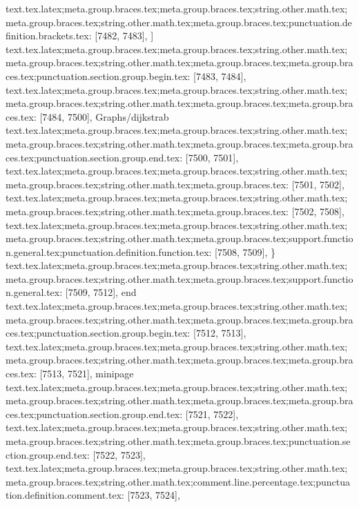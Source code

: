 {{{{{{{{{{{{{{{{{{{{{{{{{{{{{{{{{{{{{{{{{{{{{{{{{{{{{{{{{{{{{{{{{{{{{{{{{{{{{{{{{{{{{{{{{{{{{{{{{{{{{{{{{{{{{{{{{{{{{{{{{{{{{{{{{{{{{{{{{{{{{{{{{{{{{{{{{{{{{{{{{{{{{{{{{{{{{{{{{{{{{{{{{{{{{{{{{{{{{{{{{{{{text.tex.latex;meta.group.braces.tex;meta.group.braces.tex;string.other.math.tex;meta.group.braces.tex;string.other.math.tex;meta.group.braces.tex;punctuation.definition.brackets.tex: [7482, 7483], {]}
text.tex.latex;meta.group.braces.tex;meta.group.braces.tex;string.other.math.tex;meta.group.braces.tex;string.other.math.tex;meta.group.braces.tex;meta.group.braces.tex;punctuation.section.group.begin.tex: [7483, 7484], {{}
text.tex.latex;meta.group.braces.tex;meta.group.braces.tex;string.other.math.tex;meta.group.braces.tex;string.other.math.tex;meta.group.braces.tex;meta.group.braces.tex: [7484, 7500], {Graphs/dijkstrab}
text.tex.latex;meta.group.braces.tex;meta.group.braces.tex;string.other.math.tex;meta.group.braces.tex;string.other.math.tex;meta.group.braces.tex;meta.group.braces.tex;punctuation.section.group.end.tex: [7500, 7501], {}}
text.tex.latex;meta.group.braces.tex;meta.group.braces.tex;string.other.math.tex;meta.group.braces.tex;string.other.math.tex;meta.group.braces.tex: [7501, 7502], {
}
text.tex.latex;meta.group.braces.tex;meta.group.braces.tex;string.other.math.tex;meta.group.braces.tex;string.other.math.tex;meta.group.braces.tex: [7502, 7508], {      }
text.tex.latex;meta.group.braces.tex;meta.group.braces.tex;string.other.math.tex;meta.group.braces.tex;string.other.math.tex;meta.group.braces.tex;support.function.general.tex;punctuation.definition.function.tex: [7508, 7509], {\}
text.tex.latex;meta.group.braces.tex;meta.group.braces.tex;string.other.math.tex;meta.group.braces.tex;string.other.math.tex;meta.group.braces.tex;support.function.general.tex: [7509, 7512], {end}
text.tex.latex;meta.group.braces.tex;meta.group.braces.tex;string.other.math.tex;meta.group.braces.tex;string.other.math.tex;meta.group.braces.tex;meta.group.braces.tex;punctuation.section.group.begin.tex: [7512, 7513], {{}
text.tex.latex;meta.group.braces.tex;meta.group.braces.tex;string.other.math.tex;meta.group.braces.tex;string.other.math.tex;meta.group.braces.tex;meta.group.braces.tex: [7513, 7521], {minipage}
text.tex.latex;meta.group.braces.tex;meta.group.braces.tex;string.other.math.tex;meta.group.braces.tex;string.other.math.tex;meta.group.braces.tex;meta.group.braces.tex;punctuation.section.group.end.tex: [7521, 7522], {}}
text.tex.latex;meta.group.braces.tex;meta.group.braces.tex;string.other.math.tex;meta.group.braces.tex;string.other.math.tex;meta.group.braces.tex;punctuation.section.group.end.tex: [7522, 7523], {}}
text.tex.latex;meta.group.braces.tex;meta.group.braces.tex;string.other.math.tex;meta.group.braces.tex;string.other.math.tex;comment.line.percentage.tex;punctuation.definition.comment.tex: [7523, 7524], {%
}}}}}}}}}}}}}}}}}}}}}}}}}}}}}}}}}}}}}}}}}}}}}}}}}}}}}}}}}}}}}}}}}}}}}}}}}}}}}}}}}}}}}}}}}}}}}}}}}}}}}}}}}}}}}}}}}}}}}}}}}}}}}}}}}}}}}}}}}}}}}}}}}}}}}}}}}}}}}}}}}}}}}}}}}}}}}}}}}}}}}}}}}}}}}}}}}}}}}}}}}}}}}
